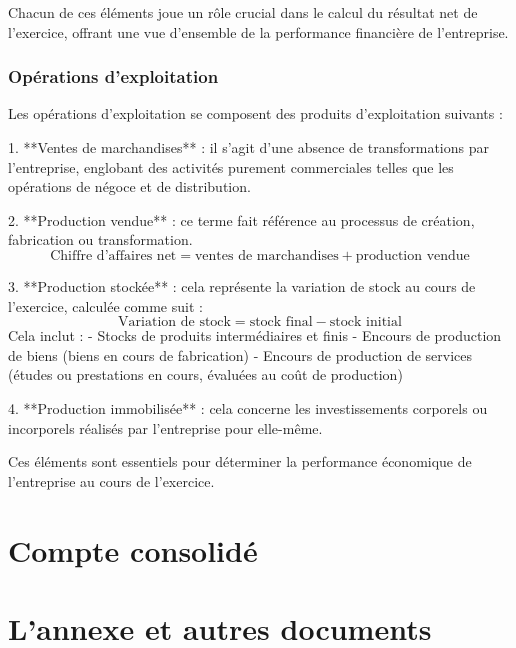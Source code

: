 \documentclass[a4paper, 12pt]{report}
\begin{document}
Chacun de ces éléments joue un rôle crucial dans le calcul du résultat net de l'exercice, offrant une vue d'ensemble de la performance financière de l'entreprise.

\subsubsection{Opérations d'exploitation}

Les opérations d'exploitation se composent des produits d'exploitation suivants :

1. **Ventes de marchandises** : il s'agit d'une absence de transformations par l'entreprise, englobant des activités purement commerciales telles que les opérations de négoce et de distribution.

2. **Production vendue** : ce terme fait référence au processus de création, fabrication ou transformation. 
\[
\text{Chiffre d'affaires net} = \text{ventes de marchandises} + \text{production vendue}
\]

3. **Production stockée** : cela représente la variation de stock au cours de l'exercice, calculée comme suit :
\[
\text{Variation de stock} = \text{stock final} - \text{stock initial}
\]
Cela inclut :
- Stocks de produits intermédiaires et finis
- Encours de production de biens (biens en cours de fabrication)
- Encours de production de services (études ou prestations en cours, évaluées au coût de production)

4. **Production immobilisée** : cela concerne les investissements corporels ou incorporels réalisés par l'entreprise pour elle-même.

Ces éléments sont essentiels pour déterminer la performance économique de l'entreprise au cours de l'exercice.












\section{Compte consolidé}



\section{L'annexe et autres documents}
\end{document}
